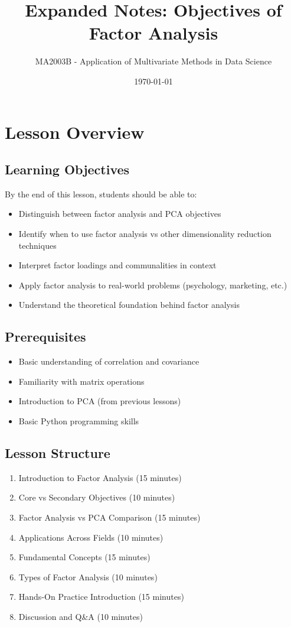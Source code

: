 \documentclass[11pt,a4paper]{article}
\title{Expanded Notes: Objectives of Factor Analysis}
\author{MA2003B - Application of Multivariate Methods in Data Science}
\date{\today}
\begin{document}
\maketitle

\tableofcontents
\newpage

\section{Lesson Overview}

\subsection{Learning Objectives}
By the end of this lesson, students should be able to:
\begin{itemize}
    \item Distinguish between factor analysis and PCA objectives
    \item Identify when to use factor analysis vs other dimensionality reduction techniques  
    \item Interpret factor loadings and communalities in context
    \item Apply factor analysis to real-world problems (psychology, marketing, etc.)
    \item Understand the theoretical foundation behind factor analysis
\end{itemize}

\subsection{Prerequisites}
\begin{itemize}
    \item Basic understanding of correlation and covariance
    \item Familiarity with matrix operations
    \item Introduction to PCA (from previous lessons)
    \item Basic Python programming skills
\end{itemize}

\subsection{Lesson Structure}
\begin{enumerate}
    \item Introduction to Factor Analysis (15 minutes)
    \item Core vs Secondary Objectives (10 minutes) 
    \item Factor Analysis vs PCA Comparison (15 minutes)
    \item Applications Across Fields (10 minutes)
    \item Fundamental Concepts (15 minutes)
    \item Types of Factor Analysis (10 minutes)
    \item Hands-On Practice Introduction (15 minutes)
    \item Discussion and Q\&A (10 minutes)
\end{enumerate}
\end{document}

